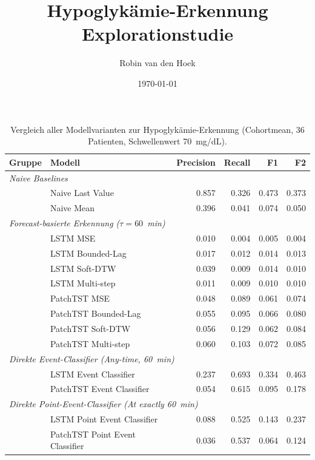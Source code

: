 \documentclass[11pt, a4paper]{article}
\title{Hypoglykämie-Erkennung Explorationstudie}
\author{Robin van den Hoek}
\date{\today}
\begin{document}
\maketitle

\begin{table}[h]
\centering
\caption{Vergleich aller Modellvarianten zur Hypoglykämie-Erkennung (Cohortmean, 36 Patienten, Schwellenwert 70~mg/dL).
}
\begin{tabular}{llrrrr}
\toprule
Gruppe & Modell & Precision & Recall & F1 & F2 \\
\midrule
\multicolumn{6}{l}{\textit{Naive Baselines}} \\[2pt]
 & Naive Last Value & 0.857 & 0.326 & 0.473 & 0.373 \\
 & Naive Mean       & 0.396 & 0.041 & 0.074 & 0.050 \\
\midrule
\multicolumn{6}{l}{\textit{Forecast-basierte Erkennung ($\tau = 60$~min)}} \\[2pt]
 & LSTM MSE          & 0.010 & 0.004 & 0.005 & 0.004 \\
 & LSTM Bounded-Lag  & 0.017 & 0.012 & 0.014 & 0.013 \\
 & LSTM Soft-DTW     & 0.039 & 0.009 & 0.014 & 0.010 \\
 & LSTM Multi-step   & 0.011 & 0.009 & 0.010 & 0.010 \\
 & PatchTST MSE         & 0.048 & 0.089 & 0.061 & 0.074 \\
 & PatchTST Bounded-Lag & 0.055 & 0.095 & 0.066 & 0.080 \\
 & PatchTST Soft-DTW    & 0.056 & 0.129 & 0.062 & 0.084 \\
 & PatchTST Multi-step  & 0.060 & 0.103 & 0.072 & 0.085 \\
\midrule
\multicolumn{6}{l}{\textit{Direkte Event-Classifier (Any-time, 60~min)}} \\[2pt]
 & LSTM Event Classifier     & 0.237 & 0.693 & 0.334 & 0.463 \\
 & PatchTST Event Classifier & 0.054 & 0.615 & 0.095 & 0.178 \\
\midrule
\multicolumn{6}{l}{\textit{Direkte Point-Event-Classifier (At exactly 60~min)}} \\[2pt]
 & LSTM Point Event Classifier     & 0.088 & 0.525 & 0.143 & 0.237 \\
 & PatchTST Point Event Classifier & 0.036 & 0.537 & 0.064 & 0.124 \\
\bottomrule
\end{tabular}
\end{table}
\end{document}
